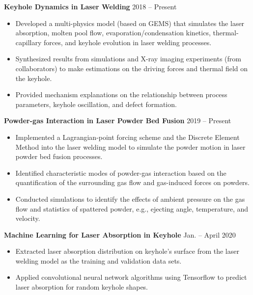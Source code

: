\documentclass[11pt, letterpaper]{article}
\begin{document}
\textbf{Keyhole Dynamics in Laser Welding} \hfill 2018 -- Present
\begin{itemize}[leftmargin=*, labelsep=5mm]
   \item Developed a multi-physics model (based on GEMS) that simulates the laser absorption, molten
      pool flow, evaporation/condensation kinetics, thermal-capillary forces, and keyhole evolution
      in laser welding processes.
   \item Synthesized results from simulations and X-ray imaging experiments (from collaborators) to
      make estimations on the driving forces and thermal field on the keyhole.
   \item Provided mechanism explanations on the relationship between process parameters, keyhole
      oscillation, and defect formation.
\end{itemize}

\vspace{3pt}
\textbf{Powder-gas Interaction in Laser Powder Bed Fusion} \hfill 2019 -- Present
\begin{itemize}[leftmargin=*, labelsep=5mm]
   \item Implemented a Lagrangian-point forcing scheme and the Discrete Element Method
      into the laser welding model to simulate the powder motion in laser powder bed fusion
      processes.
   \item Identified characteristic modes of powder-gas interaction based on the quantification of
      the surrounding gas flow and gas-induced forces on powders.
   \item Conducted simulations to identify the effects of ambient pressure on the gas flow and
      statistics of spattered powder, e.g., ejecting angle, temperature, and velocity.
\end{itemize}

\vspace{3pt}

\textbf{Machine Learning for Laser Absorption in Keyhole} \hfill Jan. -- April 2020
\begin{itemize}[leftmargin=*, labelsep=5mm]
   \item Extracted laser absorption distribution on keyhole's surface from the laser welding
      model as the training and validation data sets.
   \item Applied convolutional neural network algorithms using Tensorflow to predict laser
      absorption for random keyhole shapes.
\end{itemize}
\end{document}
